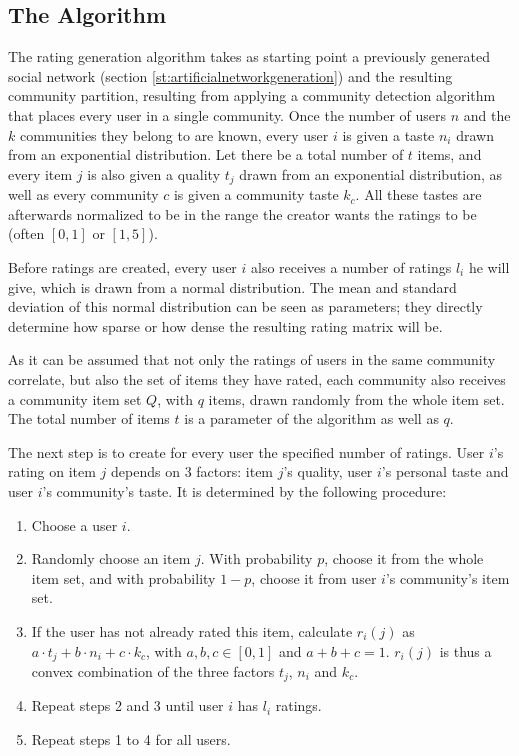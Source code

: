 \subsection{The Algorithm}
\label{sst:thealgorithm} The rating generation algorithm takes as starting point a previously generated social network (section \ref{st:artificialnetworkgeneration}) and the resulting community partition, resulting from applying a community detection algorithm that places every user in a single community. Once the number of users $n$ and the $k$ communities they belong to are known, every user $i$ is given a taste $n_i$ drawn from an exponential distribution. Let there be a total number of $t$ items, and every item $j$ is also given a quality $t_j$ drawn from an exponential distribution, as well as every community $c$ is given a community taste $k_c$. All these tastes are afterwards normalized to be in the range the creator wants the ratings to be (often $[0,1]$ or $[1,5]$).

Before ratings are created, every user $i$ also receives a number of ratings $l_i$ he will give, which is drawn from a normal distribution. The mean and standard deviation of this normal distribution can be seen as parameters; they directly determine how sparse or how dense the resulting rating matrix will be.

As it can be assumed that not only the ratings of users in the same community correlate, but also the set of items they have rated, each community also receives a community item set $Q$, with $q$ items, drawn randomly from the whole item set. The total number of items $t$ is a parameter of the algorithm as well as $q$. 

The next step is to create for every user the specified number of ratings. User $i$'s rating on item $j$ depends on 3 factors: item $j$'s quality, user $i$'s personal taste and user $i$'s community's taste. It is determined by the following procedure:

\begin{enumerate}
\item Choose a user $i$.
\item Randomly choose an item $j$. With probability $p$, choose it from the whole item set, and with probability $1-p$, choose it from user $i$'s community's item set.
\item If the user has not already rated this item, calculate $r_i(j)$ as $a \cdot t_j + b \cdot n_i + c \cdot k_c$, with $a,b,c \in [0,1]$ and $a+b+c=1$. $r_i(j)$ is thus a convex combination of the three factors $t_j$, $n_i$ and $k_c$.
\item Repeat steps 2 and 3 until user $i$ has $l_i$ ratings.
\item Repeat steps 1 to 4 for all users.
\end{enumerate}